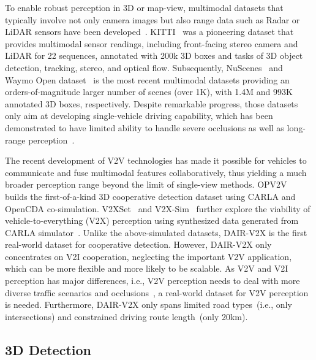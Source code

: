 \documentclass[10pt,twocolumn,letterpaper]{article}
\begin{document}
To enable robust perception in 3D or map-view, multimodal datasets that typically involve not only camera images but also range data such as Radar or LiDAR sensors have been developed~\cite{geiger2012we,caesar2020nuscenes,sun2020scalability}.
KITTI~\cite{geiger2012we} was a pioneering dataset that provides multimodal sensor readings, including front-facing stereo camera and LiDAR for 22 sequences, annotated with 200k 3D boxes and tasks of 3D object detection, tracking, stereo, and optical flow.
Subsequently, NuScenes~\cite{caesar2020nuscenes} and Waymo Open dataset~\cite{sun2020scalability} is the most recent multimodal datasets providing an orders-of-magnitude larger number of scenes (over 1K), with 1.4M and 993K annotated 3D boxes, respectively.
Despite remarkable progress, those datasets only aim at developing single-vehicle driving capability, which has been demonstrated to have limited ability to handle severe occlusions as well as long-range perception~\cite{xu2022opv2v,wang2020v2vnet,xu2022model,xu2022bridging}.

The recent development of V2V technologies has made it possible for vehicles to communicate and fuse multimodal features collaboratively, thus yielding a much broader perception range beyond the limit of single-view methods.
OPV2V~\cite{xu2022opv2v} builds the first-of-a-kind 3D cooperative detection dataset using CARLA and OpenCDA co-simulation.
V2XSet~\cite{xu2022v2xvit} and V2X-Sim~\cite{li2022v2x} further explore the viability of vehicle-to-everything (V2X) perception using synthesized data generated from CARLA simulator~\cite{dosovitskiy2017carla}.
Unlike the above-simulated datasets, DAIR-V2X is the first real-world dataset for cooperative detection.
However, DAIR-V2X only concentrates on V2I cooperation, neglecting the important V2V application, which can be more flexible and more likely to be scalable. As V2V and V2I perception has major differences, i.e., V2V perception needs to deal with more diverse traffic scenarios and occlusions~\cite{xu2022v2xvit}, a real-world dataset for V2V perception is needed. Furthermore, DAIR-V2X only spans limited road types~(i.e., only intersections) and constrained driving route length~(only 20km).

\subsection{3D Detection}
\end{document}
